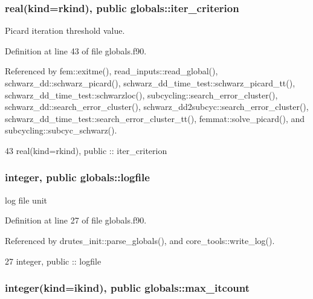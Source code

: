 \subsubsection[{iter\+\_\+criterion}]{\setlength{\rightskip}{0pt plus 5cm}real(kind=rkind), public globals\+::iter\+\_\+criterion}\label{namespaceglobals_ab18ffdecee93d35e7c9afd3416908ff7}


Picard iteration threshold value. 



Definition at line 43 of file globals.\+f90.



Referenced by fem\+::exitme(), read\+\_\+inputs\+::read\+\_\+global(), schwarz\+\_\+dd\+::schwarz\+\_\+picard(), schwarz\+\_\+dd\+\_\+time\+\_\+test\+::schwarz\+\_\+picard\+\_\+tt(), schwarz\+\_\+dd\+\_\+time\+\_\+test\+::schwarzloc(), subcycling\+::search\+\_\+error\+\_\+cluster(), schwarz\+\_\+dd\+::search\+\_\+error\+\_\+cluster(), schwarz\+\_\+dd2subcyc\+::search\+\_\+error\+\_\+cluster(), schwarz\+\_\+dd\+\_\+time\+\_\+test\+::search\+\_\+error\+\_\+cluster\+\_\+tt(), femmat\+::solve\+\_\+picard(), and subcycling\+::subcyc\+\_\+schwarz().


\begin{DoxyCode}
43   \textcolor{keywordtype}{real(kind=rkind)}, \textcolor{keywordtype}{public} :: iter_criterion
\end{DoxyCode}
\subsubsection[{logfile}]{\setlength{\rightskip}{0pt plus 5cm}integer, public globals\+::logfile}\label{namespaceglobals_aa5e82611bacbca955f6008aeddf268ae}


log file unit 



Definition at line 27 of file globals.\+f90.



Referenced by drutes\+\_\+init\+::parse\+\_\+globals(), and core\+\_\+tools\+::write\+\_\+log().


\begin{DoxyCode}
27   \textcolor{keywordtype}{integer}, \textcolor{keywordtype}{public} :: logfile
\end{DoxyCode}
\subsubsection[{max\+\_\+itcount}]{\setlength{\rightskip}{0pt plus 5cm}integer(kind=ikind), public globals\+::max\+\_\+itcount}\label{namespaceglobals_ab17b0f4671b7706b61608d0377cf95cb}


